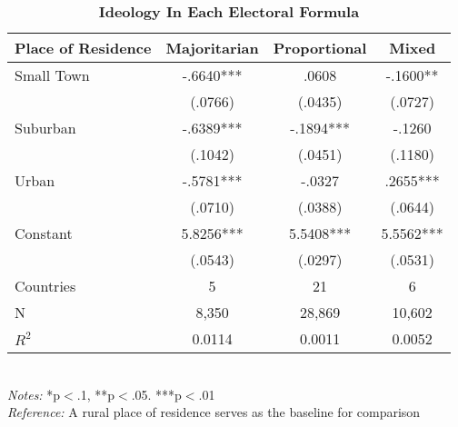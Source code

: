 \documentclass[12pt, titlepage]{article}
\newcommand\e{\emph}
\newcommand\tb{\textbf}
\begin{document}
\begin{table}[h!]
	\centering
	\caption{\tb{Ideology In Each Electoral Formula}}
	\begin{tabulary}{\linewidth}{l c c c}
		\\
		\hline
		\tb{Place of Residence}&\tb{Majoritarian}&\tb{Proportional} &\tb{Mixed} \\
		\hline
		Small Town&-.6640*** &.0608 &-.1600** \\
		&(.0766)&(.0435) &(.0727) \\
		Suburban&-.6389*** &-.1894***&-.1260  \\
		&(.1042) &(.0451) &(.1180) \\
		Urban&-.5781*** &-.0327 &.2655*** \\
		&(.0710) &(.0388) &(.0644) \\
		Constant& 5.8256*** &5.5408***&5.5562*** \\
		&(.0543) &(.0297) &(.0531) \\
		Countries&5&21&6 \\
		N&8,350&28,869 &10,602 \\
		$R^2$&0.0114&0.0011 &0.0052 \\
		\hline 
	\end{tabulary} 
	\\ 
	\e{Notes:} *p$<$.1, **p$<$.05. ***p$<$.01 \\
	\e{Reference:} A rural place of residence serves as the baseline for comparison
	\label{table16}
\end{table}
\end{document}
